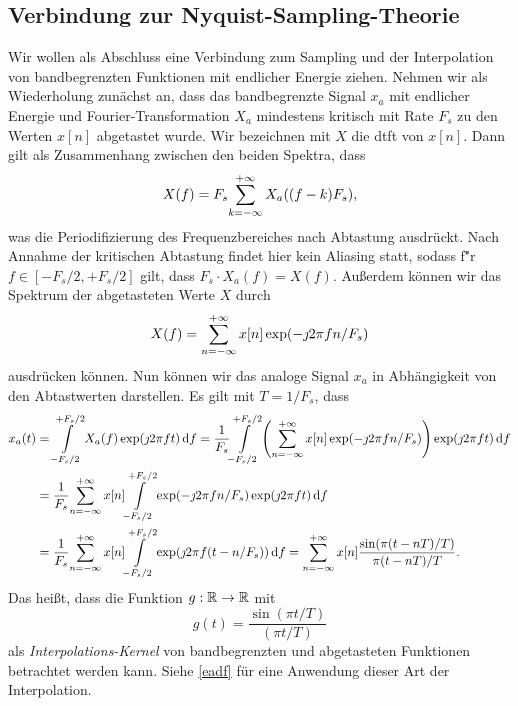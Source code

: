 \subsection{Verbindung zur Nyquist-Sampling-Theorie}
%
%
Wir wollen als Abschluss eine Verbindung zum Sampling und der Interpolation~\cite[Kapitel~6.1]{proakis2013} von bandbegrenzten Funktionen mit endlicher Energie ziehen. Nehmen wir als Wiederholung zun\"achst an, dass das bandbegrenzte Signal $x_a$ mit endlicher Energie und Fourier-Transformation $X_a$ mindestens kritisch mit Rate $F_s$ zu den Werten $x[n]$ abgetastet wurde. Wir bezeichnen mit $X$ die \gls{dtft} von $x[n]$. Dann gilt als Zusammenhang zwischen den beiden Spektra, dass
\begin{equation}
    X(f) = F_s {\sum\limits_{k=-\infty}^{+\infty}{
        X_a((f - k) F_s)
    }} ,
\end{equation}
was die Periodifizierung des Frequenzbereiches nach Abtastung ausdr\"uckt. Nach Annahme der kritischen Abtastung findet hier kein Aliasing statt, sodass f\u"r $f \in [-F_s/2,+F_s/2]$ gilt, dass $F_s \cdot X_a(f) = X(f)$. Au{\ss}erdem k\"onnen wir das Spektrum der abgetasteten Werte $X$ durch
\begin{equation}
    X(f) = {\sum\limits_{n=-\infty}^{+\infty}{x[n] \exp(- \jmath 2 \pi f n / F_s)}}
\end{equation}
ausdr\"ucken k\"onnen. Nun k\"onnen wir das analoge Signal $x_a$ in Abh\"angigkeit von den Abtastwerten darstellen. Es gilt mit $T = 1/F_s$, dass
\begin{align*}
    x_a(t) &= {\int\limits_{-F_s/2}^{+F_s/2}{
        X_a(f) \exp(\jmath 2 \pi f t)
    }\,\mathrm{d}{f}} = \frac{1}{F_s} {\int\limits_{-F_s/2}^{+F_s/2}{
        \left(
            {\sum\limits_{n=-\infty}^{+\infty}{x[n] \exp(- \jmath 2 \pi f n / F_s)}}
        \right) \exp(\jmath 2 \pi f t)
    }\,\mathrm{d}{f}} \\
    &= \frac{1}{F_s} 
        {\sum\limits_{n=-\infty}^{+\infty}{
            x[n] {\int\limits_{-F_s/2}^{+F_s/2}{\exp(- \jmath 2 \pi f n / F_s) \exp(\jmath 2 \pi f t)}\,\mathrm{d}{f}}
        }} \\
    &= \frac{1}{F_s} 
    {\sum\limits_{n=-\infty}^{+\infty}{
        x[n] {\int\limits_{-F_s/2}^{+F_s/2}{\exp(\jmath 2 \pi f (t - n/F_s))}\,\mathrm{d}{f}}
    }} 
    = {\sum\limits_{n=-\infty}^{+\infty}{
        x[n] \frac{\sin(\pi(t-nT)/T)}{\pi(t-nT)/T}
    }}.
\end{align*}
Das hei{\ss}t, dass die Funktion $g: \mathbb{R} \rightarrow \mathbb{R}$ mit
\begin{equation}\label{bsplines_sinckernel}
    g(t) = \frac{\sin(\pi t / T)}{(\pi t/T)}
\end{equation}
als \emph{Interpolations-Kernel} von bandbegrenzten und abgetasteten Funktionen betrachtet werden kann. Siehe \cref{eadf} f\"ur eine Anwendung dieser Art der Interpolation.

